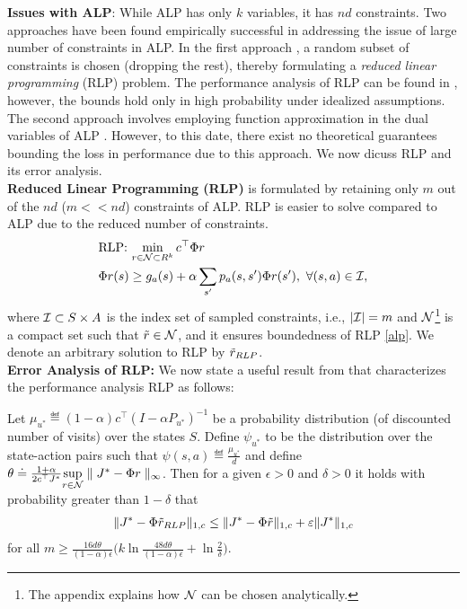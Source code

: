 \textbf{Issues with ALP}: While ALP has only $k$ variables, it has $nd$ constraints.
Two approaches have been found empirically successful \cite{CS,dolgov,ALP-Bor} in addressing the issue of large number of constraints in ALP. In the first approach \cite{CS}, a random subset of constraints is chosen (dropping the rest), thereby formulating a \emph{reduced linear programming} (RLP) problem. The performance analysis of RLP can be found in \cite{CS}, however, the bounds hold only in high probability under idealized assumptions. The second approach involves employing function approximation in the dual variables of ALP \cite{ALP-Bor,dolgov}. However, to this date, there exist no theoretical guarantees bounding the loss in performance due to this approach. We now dicuss RLP and its error analysis.\\
\textbf{Reduced Linear Programming (RLP)} is formulated by retaining only $m$ out of the $nd$ ($m<<nd$) constraints of ALP. RLP is easier to solve compared to ALP due to the reduced number of constraints.
\begin{align}\label{rlp}
\begin{split}
&\text{RLP:~}\underset{r\in \N\subset R^k}{\min}\, c^\top \Phi r\,\,\\
&\Phi r (s)\geq g_a(s)+\alpha\sum_{s'}p_a(s,s')\Phi r(s'),\,\,
\forall (s,a)\in \I,
\end{split}
\end{align}
where $\mathcal{I}\subset S \times A$ is the index set of sampled constraints, i.e., $|\mathcal{I}|=m$ and $\mathcal{N}$\footnote{The appendix explains how $\mathcal{N}$ can be chosen analytically.} is a compact set such that $\tilde{r} \in \mathcal{N}$, and it ensures boundedness of RLP \eqref{alp}. We denote an arbitrary solution to RLP by $\tilde{r}_{RLP}$.\\
\textbf{Error Analysis of RLP:} We now state a useful result from \cite{CS} that characterizes the performance analysis RLP as follows:
\begin{theorem}\label{rlpt}
Let $\mu_{u^*}\eqdef(1-\alpha)c^\top (I-\alpha P_{u^*})^{-1}$ be a probability distribution (of discounted number of visits) over the states $S$. Define $\psi_{u^*}$ to be the distribution over the state-action pairs such that $\psi(s,a)\eqdef \frac{\mu_{u^*}}{d}$ and define $\theta\doteq\frac{1+\alpha}{2 c^\top J^*}\underset{r\in \mathcal{N}}{\sup}\parallel J^*-\Phi r \parallel_\infty$. Then for a given $\epsilon>0$ and $\delta>0$ it holds with probability greater than $1-\delta$ that
\begin{align*}
\|J^*-\Phi\tilde{r}_{RLP}\|_{1,c}\leq \|J^*-\Phi\tilde{r}\|_{1,c}+\varepsilon \|J^*\|_{1,c}
\end{align*}
for all $m\geq \frac{16d\theta}{(1-\alpha)\epsilon}\big(k\ln\frac{48d\theta}{(1-\alpha)\epsilon}+\ln \frac{2}{\delta}\big)$.
\end{theorem}

